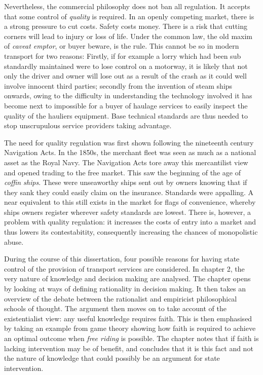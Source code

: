 Nevertheless, the commercial philosophy does not ban all regulation. It accepts that some control of \textit{quality} is required. In an openly competing market, there is a strong pressure to cut costs. Safety costs money. There is a risk that cutting corners will lead to injury or loss of life. Under the common law, the old maxim of \textit{caveat emptor}, or buyer beware, is the rule. This cannot be so in modern transport for two reasons: Firstly, if for example a lorry which had been sub standardly maintained were to lose control on a motorway, it is likely that not only the driver and owner will lose out as a result of the crash as it could well involve innocent third parties; secondly from the invention of steam ships onwards, owing to the difficulty in understanding the technology involved it has become next to impossible for a buyer of haulage services to easily inspect the quality of the hauliers equipment. Base technical standards are thus needed to stop unscrupulous service providers taking advantage.

The need for quality regulation was first shown following the nineteenth century Navigation Acts. In the 1850s, the merchant fleet was seen as much as a national asset as the Royal Navy. The Navigation Acts tore away this mercantilist view and opened trading to the free market. This saw the beginning of the age of \textit{coffin ships}. These were unseaworthy ships sent out by owners knowing that if they sank they could easily claim on the insurance. Standards were appalling. A near equivalent to this still exists in the market for flags of convenience, whereby ships owners register wherever safety standards are lowest. There is, however, a problem with quality regulation: it increases the costs of entry into a market and thus lowers its contestabitity, consequently increasing the chances of monopolistic abuse.

During the course of this dissertation, four possible reasons for having state control of the provision of transport services are considered. In chapter 2, the very nature of knowledge and decision making are analysed. The chapter opens by looking at ways of defining rationality in decision making. It then takes an overview of the debate between the rationalist and empiricist philosophical schools of thought. The argument then moves on to take account of the existentialist view: any useful knowledge requires faith. This is then emphasised by taking an example from game theory showing how faith is required to achieve an optimal outcome when \textit{free riding} is possible. The chapter notes that if faith is lacking intervention may be of benefit, and concludes that it is this fact and not the nature of knowledge that could possibly be an argument for state intervention.

